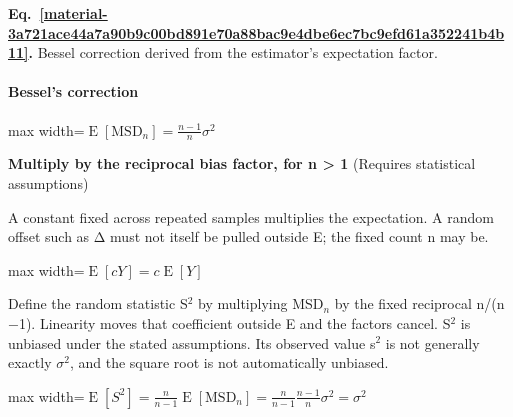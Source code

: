 \documentclass[11pt,a4paper]{article}
\begin{document}
\par\medskip
{}
\label{material-3a721ace44a7a90b9c00bd891e70a88bac9e4dbe6ec7bc9efd61a352241b4b11}
\noindent\textbf{Eq.~\ref*{material-3a721ace44a7a90b9c00bd891e70a88bac9e4dbe6ec7bc9efd61a352241b4b11}.} Bessel correction derived from the estimator's expectation factor.\par\nopagebreak
\paragraph{Bessel's correction}
\begin{center}\begin{adjustbox}{max width=\linewidth}$\displaystyle \operatorname{E}[\mathrm{MSD}_n]=\frac{n-1}{n}\sigma^2$\end{adjustbox}\end{center}
\noindent\textbf{Multiply by the reciprocal bias factor, for n > 1} (Requires statistical assumptions)\par
A constant fixed across repeated samples multiplies the expectation. A random offset such as Δ must not itself be pulled outside E; the fixed count n may be.
\begin{center}\begin{adjustbox}{max width=\linewidth}$\displaystyle \operatorname{E}[cY]=c\operatorname{E}[Y]$\end{adjustbox}\end{center}

Define the random statistic S\ensuremath{{}^2} by multiplying MSD\ensuremath{{}_n} by the fixed reciprocal n/(n\ensuremath{-}1). Linearity moves that coefficient outside E and the factors cancel. S\ensuremath{{}^2} is unbiased under the stated assumptions. Its observed value s\ensuremath{{}^2} is not generally exactly \ensuremath{\sigma}\ensuremath{{}^2}, and the square root is not automatically unbiased.
\begin{center}\begin{adjustbox}{max width=\linewidth}$\displaystyle \operatorname{E}[S^2]=\frac{n}{n-1}\operatorname{E}[\mathrm{MSD}_n]=\frac{n}{n-1}\frac{n-1}{n}\sigma^2=\sigma^2$\end{adjustbox}\end{center}
\end{document}
